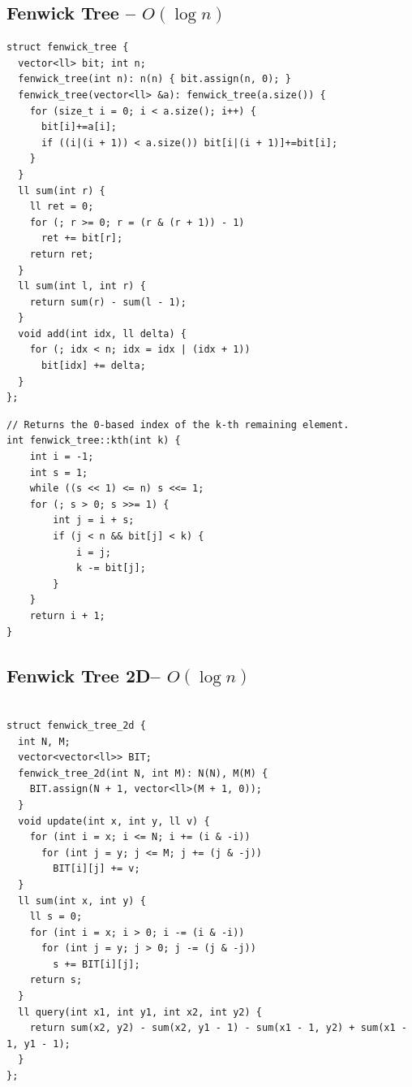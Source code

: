 \documentclass[10pt,a4paper,twocolumn]{article}
\begin{document}
    \subsection{Fenwick Tree -- $O(\log n)$}
    
	\begin{lstlisting}[style=cpp, title={fenwick$\_$tree.cpp}]
struct fenwick_tree {
  vector<ll> bit; int n;
  fenwick_tree(int n): n(n) { bit.assign(n, 0); }
  fenwick_tree(vector<ll> &a): fenwick_tree(a.size()) {
    for (size_t i = 0; i < a.size(); i++) {
      bit[i]+=a[i];
      if ((i|(i + 1)) < a.size()) bit[i|(i + 1)]+=bit[i];
    }
  }
  ll sum(int r) {
    ll ret = 0;
    for (; r >= 0; r = (r & (r + 1)) - 1)
      ret += bit[r];
    return ret;
  }
  ll sum(int l, int r) {
    return sum(r) - sum(l - 1);
  }
  void add(int idx, ll delta) {
    for (; idx < n; idx = idx | (idx + 1))
      bit[idx] += delta;
  }
};
    \end{lstlisting}

	\begin{lstlisting}[style=cpp, title={kth$\_$fenwick.cpp}]
// Returns the 0-based index of the k-th remaining element.
int fenwick_tree::kth(int k) {
    int i = -1;
    int s = 1;
    while ((s << 1) <= n) s <<= 1;
    for (; s > 0; s >>= 1) {
        int j = i + s;
        if (j < n && bit[j] < k) {
            i = j;
            k -= bit[j];
        }
    }
    return i + 1;
}
    \end{lstlisting}

    \subsection{Fenwick Tree 2D-- $O(\log n)$}
    
	\begin{lstlisting}[style=cpp, title={fenwick$\_$tree$\_$2d.cpp}]

struct fenwick_tree_2d {
  int N, M;
  vector<vector<ll>> BIT;
  fenwick_tree_2d(int N, int M): N(N), M(M) {
    BIT.assign(N + 1, vector<ll>(M + 1, 0));
  }
  void update(int x, int y, ll v) {
    for (int i = x; i <= N; i += (i & -i))
      for (int j = y; j <= M; j += (j & -j))
        BIT[i][j] += v;
  }
  ll sum(int x, int y) {
    ll s = 0;
    for (int i = x; i > 0; i -= (i & -i))
      for (int j = y; j > 0; j -= (j & -j))
        s += BIT[i][j];
    return s;
  }
  ll query(int x1, int y1, int x2, int y2) {
    return sum(x2, y2) - sum(x2, y1 - 1) - sum(x1 - 1, y2) + sum(x1 - 1, y1 - 1);
  }
};

    \end{lstlisting}
\end{document}
